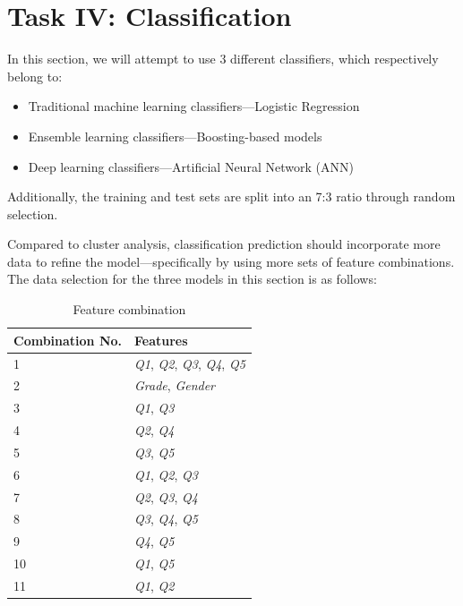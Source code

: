 \documentclass[conference]{IEEEtran}
\begin{document}
\section{\textbf{Task IV: Classification}}
In this section, we will attempt to use 3 different classifiers, which respectively belong to: 
\begin{itemize}
    \item Traditional machine learning classifiers—Logistic Regression
    \item Ensemble learning classifiers—Boosting-based models
    \item Deep learning classifiers—Artificial Neural Network (ANN)
\end{itemize}
Additionally, the training and test sets are split into an 7:3 ratio through random selection.

Compared to cluster analysis, classification prediction should incorporate more data to refine the model—specifically by using more sets of feature combinations. The data selection for the three models in this section is as follows:

\begin{table}[h!]
    \centering
    \caption{Feature combination}
    \begin{tabular}{ll}
        \toprule
        \textbf{Combination No.} & \textbf{Features} \\
        \midrule
        1 & \textit{Q1}, \textit{Q2}, \textit{Q3}, \textit{Q4}, \textit{Q5} \\
        2 & \textit{Grade}, \textit{Gender}\\
        3 & \textit{Q1}, \textit{Q3}\\
        4 & \textit{Q2}, \textit{Q4}\\
        5 & \textit{Q3}, \textit{Q5}\\
        6 & \textit{Q1}, \textit{Q2}, \textit{Q3}\\
        7 & \textit{Q2}, \textit{Q3}, \textit{Q4}\\
        8 & \textit{Q3}, \textit{Q4}, \textit{Q5}\\
        9 & \textit{Q4}, \textit{Q5}\\
        10 & \textit{Q1}, \textit{Q5}\\
        11 & \textit{Q1}, \textit{Q2}\\
        \bottomrule
    \end{tabular}
\end{table}
\end{document}
